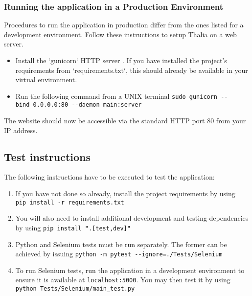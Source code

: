 \documentclass[main.tex]{subfiles}
\begin{document}
\subsubsection{Running the application in a Production
Environment}
\label{run-in-a-production-environemnt}

Procedures to run the application in production differ from the ones listed for a development environment. Follow these instructions to setup Thalia on a web server.

\begin{itemize}
\item
  Install the `gunicorn` HTTP server \cite{Gunicorn}. If you have installed the project's requirements from `requirements.txt`, this should already be available in your virtual environment.
\item
  Run the following command from a UNIX terminal 
  \newline
  \texttt{sudo\ gunicorn\ -\/-bind\ 0.0.0.0:80\ -\/-daemon\ main:server}
\end{itemize}
The website should now be accessible via the standard HTTP port 80 from your IP address.

\subsection{Test instructions}
\label{test-instructions}

The following instructions have to be executed to test the application:

\begin{enumerate}
 \item If you have not done so already, install the project requirements by using
 \newline
 \texttt{pip\ install\ -r\ requirements.txt}
 
 \item You will also need to install additional development and testing dependencies by using
 \newline
 \texttt{pip\ install\ ".{[}test,dev{]}"}
  
  \item Python and Selenium tests must be run separately. The former can be achieved by issuing
  \newline
  \texttt{python\ -m\ pytest\ -\/-ignore=./Tests/Selenium}
  
  \item To run Selenium tests, run the application in a development environment to ensure it is available at \texttt{localhost:5000}. You may then test it by using
  \newline
  \texttt{python\ Tests/Selenium/main\_test.py}
\end{enumerate}
\end{document}
